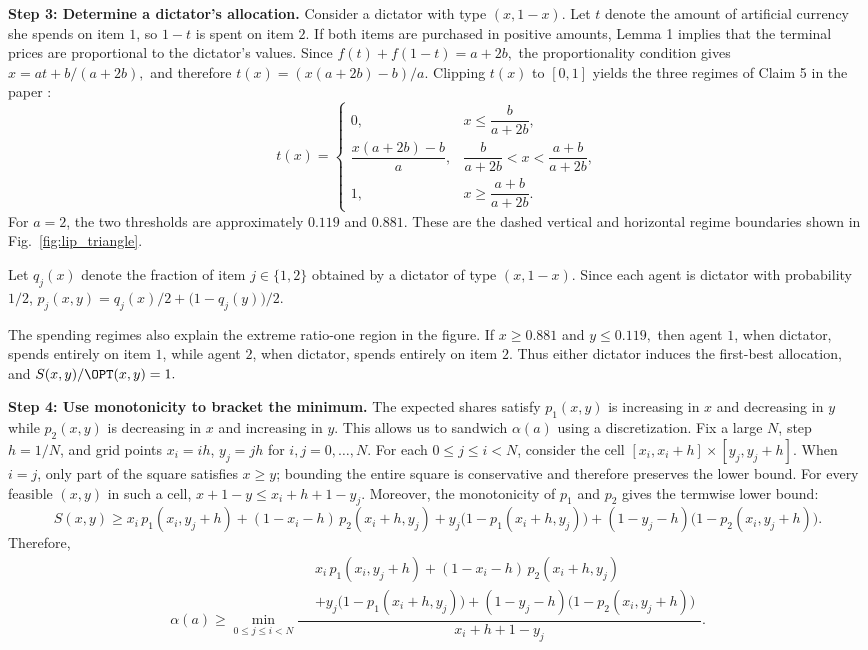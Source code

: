\textbf{Step 3: Determine a dictator's allocation.}
Consider a dictator with type $(x,1-x)$. Let $t$ denote the amount of artificial currency she spends on item $1$, so $1-t$ is spent on item $2$. If both items are purchased in positive amounts, Lemma 1 implies that the terminal prices are proportional to the dictator's values. Since $f(t)+f(1-t)=a+2b,$ the proportionality condition gives $x={at+b}/({a+2b}),$ and therefore $t(x)=({x(a+2b)-b})/{a}.$ Clipping $t(x)$ to $[0,1]$ yields the three regimes of Claim 5 in the paper \cite{GuoConitzer2010}: 
\[
t(x)=
\begin{cases}
0, & x\le \dfrac{b}{a+2b},\\[2mm]
\dfrac{x(a+2b)-b}{a},
& \dfrac{b}{a+2b}<x<\dfrac{a+b}{a+2b},\\[3mm]
1, & x\ge \dfrac{a+b}{a+2b}.
\end{cases}
\]
For $a=2$, the two thresholds are approximately $0.119$ and $ 0.881.$
These are the dashed vertical and horizontal regime boundaries shown in Fig.~\ref{fig:lip_triangle}.

Let $q_j(x)$ denote the fraction of item $j \in \{1,2\}$ obtained by a dictator of type $(x,1-x)$. Since each agent is dictator with probability $1/2$, $p_j(x,y) =  q_j(x)/2 + \bigl(1-q_j(y)\bigr)/2.$

The spending regimes also explain the extreme ratio-one region in the figure.
If $x\ge0.881$ and $y\le0.119,$ then agent $1$, when dictator, spends entirely on item $1$, while agent $2$,
when dictator, spends entirely on item $2$. Thus either dictator induces the
first-best allocation, and ${S(x,y)}/{\OPT(x,y)}=1.$

\textbf{Step 4: Use monotonicity to bracket the minimum.}
The expected shares satisfy $p_1(x,y)$  is increasing in $x$ and decreasing in $y$ while $p_2(x,y)$ is decreasing in $x$ and increasing in $y$. This allows us to sandwich $\alpha(a)$ using a discretization. Fix a large $N$, step $h=1/N$, and grid points $x_i = ih$, $y_j = jh$ for $i,j = 0,\dots,N$. For each $0\le j\le i<N$, consider the cell $[x_i,x_i+h]\times[y_j,y_j+h]$. When $i=j$, only part of the square satisfies $x\ge y$; bounding the
entire square is conservative and therefore preserves the lower bound. 
For every feasible $(x,y)$ in such a cell, $x+1-y\le x_i+h+1-y_j.$ Moreover, the monotonicity of $p_1$ and $p_2$ gives the termwise lower
bound:
\[
S(x,y)\ge
x_i\,p_1(x_i,y_j+h)
+(1-x_i-h)\,p_2(x_i+h,y_j)
+y_j\bigl(1-p_1(x_i+h,y_j)\bigr)
+(1-y_j-h)\bigl(1-p_2(x_i,y_j+h)\bigr).
\]
Therefore,
\[
\alpha(a)
\ge
\min_{0\le j\le i<N}
\frac{
\begin{aligned}
&x_i\,p_1(x_i,y_j+h) 
+(1-x_i-h)\,p_2(x_i+h,y_j) \\
&+y_j\bigl(1-p_1(x_i+h,y_j)\bigr) 
+(1-y_j-h)\bigl(1-p_2(x_i,y_j+h)\bigr)
\end{aligned}
}{
x_i+h+1-y_j
}.
\]

